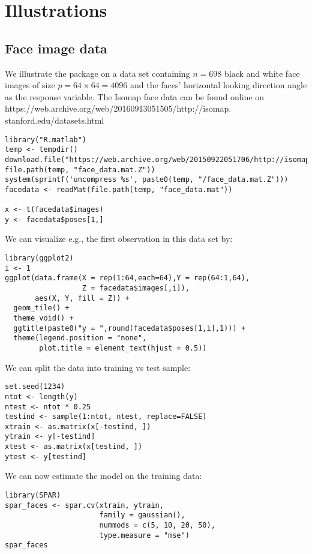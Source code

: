 \documentclass[
  article]{jss}
\begin{document}
\section{Illustrations}\label{sec-illustrations}

\subsection{Face image data}\label{face-image-data}

We illustrate the package on a data set containing \(n = 698\) black and
white face images of size \(p = 64 \times 64 = 4096\) and the faces'
horizontal looking direction angle as the response variable. The Isomap
face data can be found online on
https://web.archive.org/web/20160913051505/http://isomap.
stanford.edu/datasets.html

\begin{verbatim}
library("R.matlab")
temp <- tempdir()
download.file("https://web.archive.org/web/20150922051706/http://isomap.stanford.edu/face_data.mat.Z", file.path(temp, "face_data.mat.Z"))
system(sprintf('uncompress %s', paste0(temp, "/face_data.mat.Z")))
facedata <- readMat(file.path(temp, "face_data.mat"))

x <- t(facedata$images)
y <- facedata$poses[1,]
\end{verbatim}

We can visualize e.g., the first observation in this data set by:

\begin{verbatim}
library(ggplot2)
i <- 1
ggplot(data.frame(X = rep(1:64,each=64),Y = rep(64:1,64),
                  Z = facedata$images[,i]),
       aes(X, Y, fill = Z)) +
  geom_tile() +
  theme_void() +
  ggtitle(paste0("y = ",round(facedata$poses[1,i],1))) +
  theme(legend.position = "none",
        plot.title = element_text(hjust = 0.5))
\end{verbatim}

We can split the data into training vs test sample:

\begin{verbatim}
set.seed(1234)
ntot <- length(y)
ntest <- ntot * 0.25
testind <- sample(1:ntot, ntest, replace=FALSE)
xtrain <- as.matrix(x[-testind, ])
ytrain <- y[-testind]
xtest <- as.matrix(x[testind, ])
ytest <- y[testind]
\end{verbatim}

We can now estimate the model on the training data:

\begin{verbatim}
library(SPAR)
spar_faces <- spar.cv(xtrain, ytrain,
                      family = gaussian(),
                      nummods = c(5, 10, 20, 50),
                      type.measure = "mse")
spar_faces
\end{verbatim}
\end{document}
